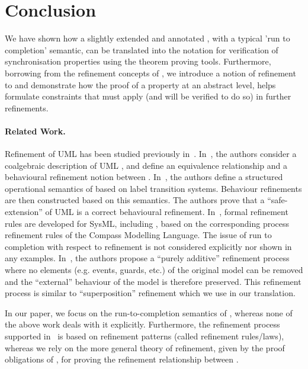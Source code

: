
\section{Conclusion}
\label{sec:conclusion}
We have shown how a slightly extended and annotated \statechart, with a typical 'run to completion' semantic, can be translated into the \EventB notation for verification of synchronisation properties using the \EventB theorem proving tools.
Furthermore, borrowing from the refinement concepts of \EventB, we introduce a notion of refinement to \statecharts and demonstrate how the proof of a property at an abstract level, helps formulate constraints that must apply (and will be verified to do so) in further refinements.

\paragraph{Related Work.} Refinement of UML \statecharts has been  studied previously in~\cite{MeNaBa04,SzVi10,MiCa14,HaSyLu15,LiMiCaCoTySaHaLaLe17}. 
In~\cite{MeNaBa04}, the authors consider a coalgebraic description of UML \statecharts, and define an equivalence relationship and a behavioural refinement notion between \statecharts. 
In~\cite{SzVi10}, the authors define a structured operational semantics of \statecharts based on label transition systems.  
Behaviour refinements are then constructed based on this semantics. 
The authors prove that a ``safe-extension'' of UML \statecharts is a correct behavioural refinement.
In~\cite{MiCa14,LiMiCaCoTySaHaLaLe17}, formal refinement rules are developed for SysML, including \statecharts, based on the corresponding process refinement rules of the Compass Modelling Language. 
The issue of run to completion with respect to refinement is not considered explicitly  nor shown in any examples.
In~\cite{HaSyLu15}, the authors propose  a ``purely additive'' refinement process where no elements (e.g. events, guards, etc.) of the original model can be removed and the ``external'' behaviour of the model is therefore preserved.  
This refinement process is similar to \EventB ``superposition'' refinement which we use in our translation.  

In our paper, we focus on the run-to-completion semantics of \statecharts, whereas none of the above work deals with it explicitly. 
Furthermore, the refinement process supported in~\cite{MeNaBa04,MiCa14,HaSyLu15,LiMiCaCoTySaHaLaLe17} is based on refinement patterns (called refinement rules/laws), whereas we rely on the more general theory of refinement, given by the proof obligations of \EventB, for proving the refinement relationship between \statecharts.


